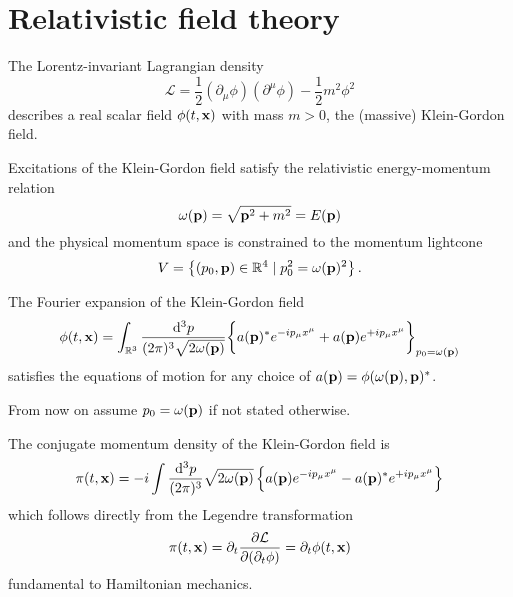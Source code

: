 \section{Relativistic field theory}

\begin{definition}
	The Lorentz-invariant Lagrangian density
	\begin{equation}
		\mathcal{L}
		=
		\frac{1}{2}
		\left(\partial_\mu\phi\right)
		\left(\partial^\mu\phi\right)
		-
		\frac{1}{2}
		m^2\phi^2
		\label{eq:kg_lagrangian}
	\end{equation}
	describes a real scalar field $\phi(t,\vb{x})$ with mass $m>0$, the (massive) Klein-Gordon field.
\end{definition}
\begin{theorem}\label{th:relativistic_energy_momentum}
	Excitations of the Klein-Gordon field satisfy the relativistic energy-momentum relation
	\begin{equation}
		\omega(\vb{p})
		=
		\sqrt{\vb{p}^2+m^2}
		=
		E(\vb{p})
		\label{eq:energy_momentum_relation}
	\end{equation}
	and the physical momentum space is constrained to the momentum lightcone
	\begin{equation}
		V
		=
		\left\{
			(p_0,\vb{p})\in\mathbb{R}^4
			\mid
			p_0^2=\omega(\vb{p})^2
		\right\}
		\label{eq:momentum_lightcone}
		.
	\end{equation}
\end{theorem}
\begin{theorem}\label{thm:kg_fourier_expansion}
	The Fourier expansion of the Klein-Gordon field
	\begin{equation}
		\phi(t,\vb{x})
		=
		\int_{\mathbb{R}^3}\frac{\dd[3]{p}}{(2\pi)^3\sqrt{2\omega(\vb{p})}}
		\biggl\{
			a(\vb{p})^*
			e^{-ip_\mu x^\mu}
			+
			a(\vb{p})
			e^{+ip_\mu x^\mu}
		\biggr\}_{p_0=\omega(\vb{p})}
	\end{equation}
	satisfies the equations of motion for any choice of $a(\vb{p})=\phi(\omega(\vb{p}),\vb{p})^*$.
\end{theorem}
From now on assume $p_0=\omega(\vb{p})$ if not stated otherwise.
\begin{corollary}
	The conjugate momentum density of the Klein-Gordon field is
	\begin{equation}
		\pi(t,\vb{x})
		=
		-i
		\int\frac{\dd[3]{p}}{(2\pi)^3}
		\sqrt{2\omega(\vb{p})}
		\left\{
			a(\vb{p})
			e^{-ip_\mu x^\mu}
			-
			a(\vb{p})^*
			e^{+ip_\mu x^\mu}
		\right\}
	\end{equation}
	which follows directly from the Legendre transformation
	\begin{equation}
		\pi(t,\vb{x})
		=
		\partial_t\pdv{\mathcal{L}}{(\partial_t\phi)}
		=
		\partial_t\phi(t,\vb{x})
	\end{equation}
	fundamental to Hamiltonian mechanics.
\end{corollary}

